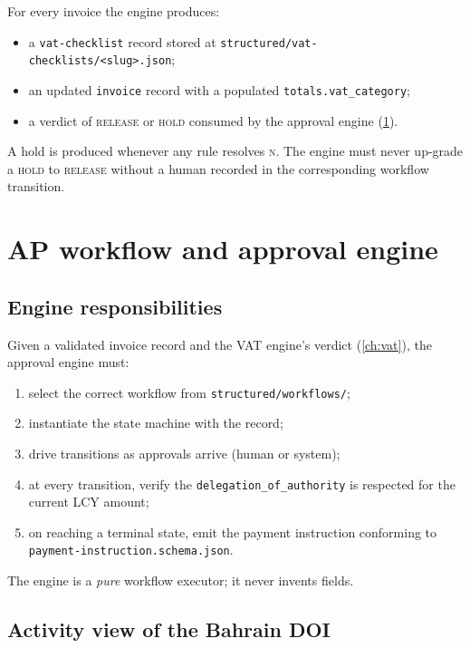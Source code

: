 \documentclass[11pt,a4paper,twoside]{report}
\newcommand{\corpus}{}
\begin{document}
For every invoice the engine produces:
\begin{itemize}
  \item a \texttt{vat-checklist} record stored at
        \texttt{structured/vat-checklists/<slug>.json};
  \item an updated \texttt{invoice} record with a populated
        \texttt{totals.vat\_category};
  \item a verdict of \textsc{release} or \textsc{hold} consumed by the
        approval engine (\cref{ch:ap}).
\end{itemize}

A hold is produced whenever any rule resolves \textsc{n}. The engine
must never up-grade a \textsc{hold} to \textsc{release} without a human
recorded in the corresponding workflow transition.
\chapter{AP workflow and approval engine}\label{ch:ap}

\section{Engine responsibilities}

Given a validated invoice record and the VAT engine's verdict
(\cref{ch:vat}), the approval engine must:

\begin{enumerate}
  \item select the correct workflow from
        \corpus\texttt{structured/workflows/};
  \item instantiate the state machine with the record;
  \item drive transitions as approvals arrive (human or system);
  \item at every transition, verify the
        \texttt{delegation\_of\_authority} is respected for the current
        LCY amount;
  \item on reaching a terminal state, emit the payment instruction
        conforming to \texttt{payment-instruction.schema.json}.
\end{enumerate}

The engine is a \emph{pure} workflow executor; it never invents fields.

\section{Activity view of the Bahrain DOI}
\end{document}
